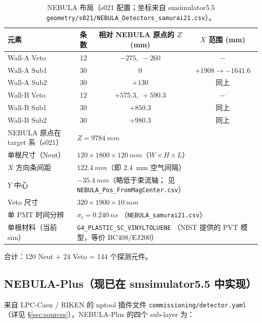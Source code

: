 \documentclass[a4paper,11pt]{ctexart}
\newcommand{\NEB}{NEBULA}
\newcommand{\NPL}{NEBULA-Plus}
\begin{document}
\begin{table}[h]
\centering
\caption{\NEB{} 布局（s021 配置；坐标来自 smsimulator5.5
\texttt{geometry/s021/NEBULA\_Detectors\_samurai21.csv}）。}
\begin{tabular}{lccc}
\toprule
元素 & 条数 & 相对 \NEB{} 原点的 $Z$ (mm) & $X$ 范围 (mm) \\
\midrule
Wall-A Veto    & 12 & $-275,\;-260$         & $-$ \\
Wall-A Sub1    & 30 & $0$                   & $+1908 \to -1641.6$\\
Wall-A Sub2    & 30 & $+130$                & 同上\\
Wall-B Veto    & 12 & $+575.3,\;+590.3$     & $-$ \\
Wall-B Sub1    & 30 & $+850.3$              & 同上\\
Wall-B Sub2    & 30 & $+980.3$              & 同上\\
\midrule
\NEB{} 原点在 target 系（s021） & \multicolumn{3}{l}{$Z = \SI{9784}{mm}$}\\
单根尺寸（Neut） & \multicolumn{3}{l}{$120 \times 1800 \times \SI{120}{mm}$（$W\times H\times L$）}\\
$X$ 方向条间距 & \multicolumn{3}{l}{$\SI{122.4}{mm}$（即 \SI{2.4}{mm} 空气间隔）}\\
$Y$ 中心 & \multicolumn{3}{l}{$\SI{-35.4}{mm}$（略低于束流轴；
                       见 \texttt{NEBULA\_Pos\_FromMagCenter.csv}）}\\
Veto 尺寸 & \multicolumn{3}{l}{$320 \times 1900 \times \SI{10}{mm}$}\\
单 PMT 时间分辨 & \multicolumn{3}{l}{$\sigma_t = \SI{0.240}{ns}$
                       （\texttt{NEBULA\_samurai21.csv}）}\\
单根材料（当前 sim） & \multicolumn{3}{l}{\texttt{G4\_PLASTIC\_SC\_VINYLTOLUENE}
                       （NIST 提供的 PVT 模型，等价 BC408/EJ200）}\\
\bottomrule
\end{tabular}
\end{table}

合计：120 Neut + 24 Veto = 144 个探测元件。

\subsection{\NPL{}（现已在 smsimulator5.5 中实现）}
\label{sec:internal-npl}

来自 LPC-Caen / RIKEN 的 nptool 插件文件
\texttt{commissioning/detector.yaml}（详见 \S\ref{sec:sources}），\NPL{}
的四个 sub-layer 为：
\end{document}
